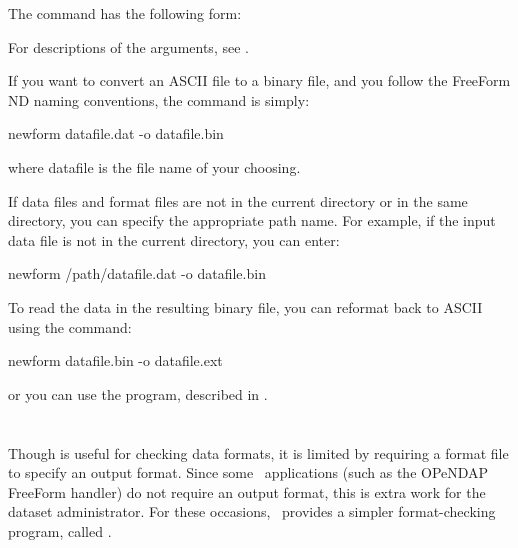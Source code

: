 The  command has the following form: 


For descriptions of the arguments, see .

If you want to convert an ASCII file to a binary file, and you follow
the FreeForm ND naming conventions, the command is simply:

\begin{example}
newform datafile.dat -o datafile.bin 
\end{example}

where datafile is the file name of your choosing. 

If data files and format files are not in the current directory or in
the same directory, you can specify the appropriate path name.  For
example, if the input data file is not in the current directory, you
can enter:

\begin{example}
newform /path/datafile.dat -o datafile.bin
\end{example}


To read the data in the resulting binary file, you can reformat back
to ASCII using the command:

\begin{example}
newform datafile.bin -o datafile.ext 
\end{example}

or you can use the  program, described in
. 



\section{}
\label{ff,chkform}


Though  is useful for checking data formats, it is
limited by requiring a format file to specify an output format.  Since
some \ffnd\ applications (such as the OPeNDAP FreeForm handler) do not
require an output format, this is extra work for the dataset
administrator.  For these occasions, \ffnd\ provides a simpler
format-checking program, called .

